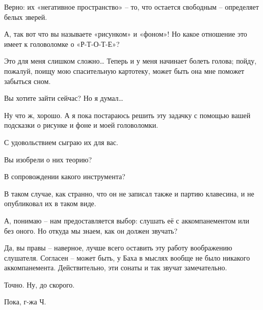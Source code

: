 \documentclass[../main.tex]{subfiles}
\begin{document}
\begin{dialogue}
 Верно: их «негативное пространство» \--- то, что остается свободным \--- определяет белых зверей.

 А, так вот что вы называете «рисунком» и «фоном»! Но какое отношение это имеет к головоломке о «\mbox{Р-Т-О-Т-Е}»?

 Это для меня слишком сложно\ldots{} Теперь и у меня начинает болеть голова; пойду, пожалуй, поищу мою спасительную картотеку, может быть она мне поможет забыться сном.

 Вы хотите зайти сейчас? Но я думал\ldots{}

 Ну что ж, хорошо. А я пока постараюсь решить эту задачку с помощью вашей подсказки о рисунке и фоне и моей головоломки.

 С удовольствием сыграю их для вас.

 Вы изобрели о них теорию?

 В сопровождении какого инструмента?

 В таком случае, как странно, что он не записал также и партию клавесина, и не опубликовал их в таком виде.

 А, понимаю \--- нам предоставляется выбор: слушать её с аккомпанементом или без оного. Но откуда мы знаем, как он должен звучать?

 Да, вы правы \--- наверное, лучше всего оставить эту работу воображению слушателя. Согласен \--- может быть, у Баха в мыслях вообще не было никакого аккомпанемента. Действительно, эти сонаты и так звучат замечательно.

 Точно. Ну, до скорого.

 Пока, г-жа Ч.

\end{dialogue}
\end{document}
